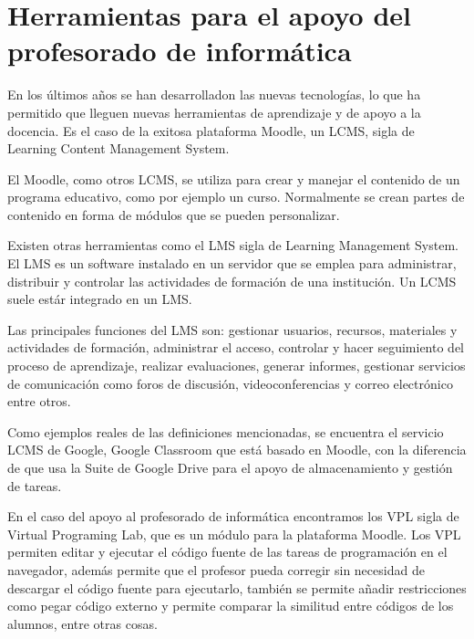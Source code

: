 
\section{Herramientas para el apoyo del profesorado de informática}
\label{1:sec:1}

En los últimos años se han desarrolladon las nuevas tecnologías, lo que ha permitido que lleguen nuevas herramientas de aprendizaje y de apoyo a la docencia. Es el caso de la exitosa plataforma Moodle, un LCMS, sigla de Learning Content Management System. 

El Moodle, como otros LCMS, se utiliza para crear y manejar el contenido de un programa educativo, como por ejemplo un curso. Normalmente se crean partes de contenido en forma de módulos que se pueden personalizar.

Existen otras herramientas como el LMS sigla de Learning Management System. El LMS es un software instalado en un servidor que se emplea para administrar, distribuir y controlar las actividades de formación de una institución. Un LCMS suele estár integrado en un LMS.

Las principales funciones del LMS son: gestionar usuarios, recursos, materiales y actividades de formación, administrar el acceso, controlar y hacer seguimiento del proceso de aprendizaje, realizar evaluaciones, generar informes, gestionar servicios de comunicación como foros de discusión, videoconferencias y correo electrónico entre otros.

Como ejemplos reales de las definiciones mencionadas, se encuentra el servicio LCMS de Google, Google Classroom que está basado en Moodle, con la diferencia de que usa la Suite de Google Drive para el apoyo de almacenamiento y gestión de tareas.

En el caso del apoyo al profesorado de informática encontramos los VPL sigla de Virtual Programing Lab, que es un módulo para la plataforma Moodle. Los VPL permiten editar y ejecutar el código fuente de las tareas de programación en el navegador, además permite que el profesor pueda corregir sin necesidad de descargar el código fuente para ejecutarlo, también se permite añadir restricciones como pegar código externo y permite comparar la similitud entre códigos de los alumnos, entre otras cosas.

